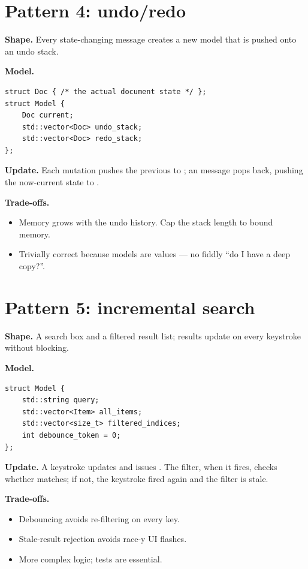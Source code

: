 \section{Pattern 4: undo/redo}

\textbf{Shape.} Every state-changing message creates a new model
that is pushed onto an undo stack.

\textbf{Model.}

\begin{lstlisting}
struct Doc { /* the actual document state */ };
struct Model {
    Doc current;
    std::vector<Doc> undo_stack;
    std::vector<Doc> redo_stack;
};
\end{lstlisting}

\textbf{Update.} Each mutation pushes the previous 
to ; an  message pops back, pushing
the now-current state to .

\textbf{Trade-offs.}

\begin{itemize}[leftmargin=*]
  \item Memory grows with the undo history. Cap the stack length
    to bound memory.
  \item Trivially correct because models are values --- no
    fiddly ``do I have a deep copy?''.
\end{itemize}

\section{Pattern 5: incremental search}

\textbf{Shape.} A search box and a filtered result list; results
update on every keystroke without blocking.

\textbf{Model.}

\begin{lstlisting}
struct Model {
    std::string query;
    std::vector<Item> all_items;
    std::vector<size_t> filtered_indices;
    int debounce_token = 0;
};
\end{lstlisting}

\textbf{Update.} A keystroke updates  and issues
. The filter, when
it fires, checks whether  matches; if not,
the keystroke fired again and the filter is stale.

\textbf{Trade-offs.}

\begin{itemize}[leftmargin=*]
  \item Debouncing avoids re-filtering on every key.
  \item Stale-result rejection avoids race-y UI flashes.
  \item More complex  logic; tests are essential.
\end{itemize}

